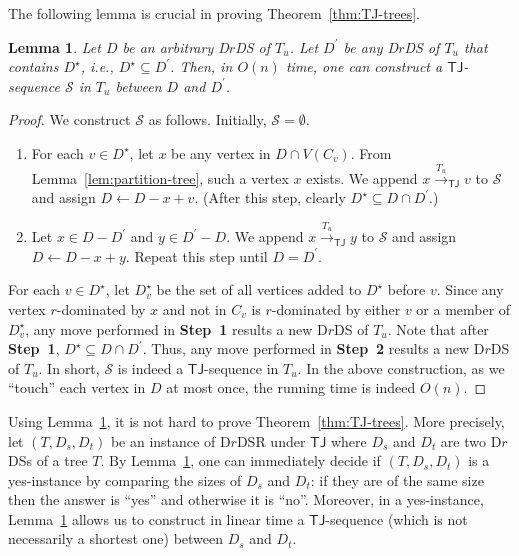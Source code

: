 \documentclass[a4paper]{article}
\theoremstyle{plain}
\newtheorem{lemma}[theorem]{Lemma}
\theoremstyle{definition}
\newcommand{\sfTJ}{{\mathsf{TJ}}} %
\newcommand{\sfR}{{\mathsf{R}}} %
\newcommand{\calS}{{\mathcal{S}}}
\newcommand{\reconf}[2][\sfR]{\overset{#2}{\longrightarrow}_{#1}} %
\begin{document}
The following lemma is crucial in proving Theorem~\ref{thm:TJ-trees}.
\begin{lemma}\label{lem:TJ-trees}
	Let $D$ be an arbitrary D$r$DS of $T_u$.
	Let $D^\prime$ be any D$r$DS of $T_u$ that contains $D^\star$, i.e., $D^\star \subseteq D^\prime$.
	Then, in $O(n)$ time, one can construct a $\sfTJ$-sequence $\calS$ in $T_u$ between $D$ and $D^\prime$.
\end{lemma}
\begin{proof}

	We construct $\calS$ as follows. 
	Initially, $\calS = \emptyset$.
	\begin{enumerate}[{\bf {Step} 1:}]
		\item For each $v \in D^\star$, let $x$ be any vertex in $D \cap V(C_v)$.
		From Lemma~\ref{lem:partition-tree}, such a vertex $x$ exists.
		We append $x \reconf[\sfTJ]{T_u} v$ to $\calS$ and assign $D \gets D - x + v$.
		(After this step, clearly $D^\star \subseteq D \cap D^\prime$.)
		
		\item Let $x \in D - D^\prime$ and $y \in D^\prime - D$. 
		We append $x \reconf[\sfTJ]{T_u} y$ to $\calS$ and assign $D \gets D - x + y$.
		Repeat this step until $D = D^\prime$.
	\end{enumerate}
	
	For each $v \in D^\star$, let $D^\star_v$ be the set of all vertices added to $D^\star$ before $v$.
	Since any vertex $r$-dominated by $x$ and not in $C_v$ is $r$-dominated by either $v$ or a member of $D^\star_v$, any move performed in \textbf{Step~1} results a new D$r$DS of $T_u$.
	Note that after {\bf Step~1}, $D^\star \subseteq D \cap D^\prime$.
	Thus, any move performed in {\bf Step~2} results a new D$r$DS of $T_u$.
	In short, $\calS$ is indeed a $\sfTJ$-sequence in $T_u$.
	In the above construction, as we ``touch'' each vertex in $D$ at most once, the running time is indeed $O(n)$.
\end{proof}

Using Lemma~\ref{lem:TJ-trees}, it is not hard to prove Theorem~\ref{thm:TJ-trees}.
More precisely, let $(T, D_s, D_t)$ be an instance of \textsc{D$r$DSR} under $\sfTJ$ where $D_s$ and $D_t$ are two D$r$DSs of a tree $T$.
By Lemma~\ref{lem:TJ-trees}, one can immediately decide if $(T, D_s, D_t)$ is a yes-instance by comparing the sizes of $D_s$ and $D_t$: if they are of the same size then the answer is ``yes'' and otherwise it is ``no''.
Moreover, in a yes-instance, Lemma~\ref{lem:TJ-trees} allows us to construct in linear time a $\sfTJ$-sequence (which is not necessarily a shortest one) between $D_s$ and $D_t$.
\end{document}
